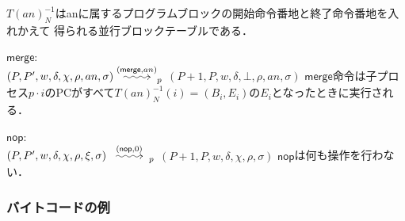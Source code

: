 \documentclass[submit,PRO]{ipsj}
\makeatletter
\newcommand{\longsquiggly}{\xymatrix{{}\ar@{~>}[r]&{}}}
\newcommand{\bcode}[1]{$\mathsf{#1}$}
\newcommand{\brightarrow}[1]{\stackrel{#1}{\longsquiggly}}
\makeatother
\begin{document}
\begin{list}
$T(an)^{-1}_N$はanに属するプログラムブロックの開始命令番地と終了命令番地を入れかえて
得られる並行ブロックテーブルである．
\item \bcode{merge}:\\
$(P,P',w,\delta,\chi,\rho,an,\sigma)\brightarrow{(\mathsf{merge},an)}_p$\newline
\qquad $(P+1,P,w,\delta,\bot,\rho,an,\sigma)$\newline
\bcode{merge}命令は子プロセス$p\cdot i$のPCがすべて$T(an)^{-1}_N(i)=(B_i,E_i)$の$E_i$となったときに実行される．
\item \bcode{nop}:\\
$(P,P',w,\delta,\chi,\rho,\xi,\sigma)\brightarrow{(\mathsf{nop},0)}_p$\newline
\qquad $(P+1,P,w,\delta,\chi,\rho,\sigma)$\newline
\bcode{nop}は何も操作を行わない．

\end{list}

\subsubsection{バイトコードの例}
\end{document}
